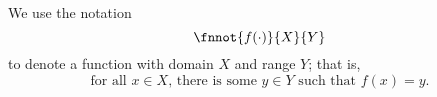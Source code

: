 \begin{note}
  We use the notation
  $$\fnnot{f(\cdot)}{X}{Y}$$
  to denote a function with domain $X$ and range $Y$;
  that is, 
  $$\text{for all $x \in X$, there is some $y \in Y$ such that $f(x) = y$}.$$%
\end{note}
